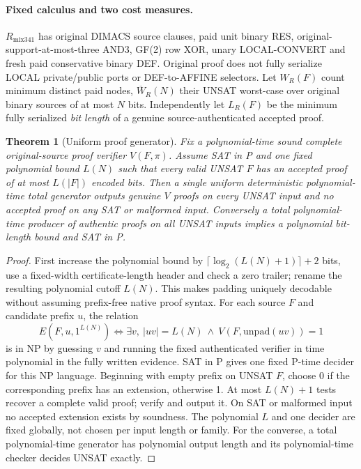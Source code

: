 \documentclass[11pt]{article}
\newtheorem{theorem}{Theorem}
\begin{document}
\paragraph{Fixed calculus and two cost measures.} $R_{\mathrm{mix341}}$ has original DIMACS source clauses, paid unit binary RES, original-support-at-most-three AND3, GF(2) row XOR, unary LOCAL-CONVERT and fresh paid conservative binary DEF. Original proof does not fully serialize LOCAL private/public ports or DEF-to-AFFINE selectors. Let $W_R(F)$ count minimum distinct paid nodes, $\overline W_R(N)$ their UNSAT worst-case over original binary sources of at most $N$ bits. Independently let $L_R(F)$ be the minimum fully serialized \emph{bit length} of a genuine source-authenticated accepted proof.
\begin{theorem}[Uniform proof generator]\label{t1}
Fix a polynomial-time sound complete original-source proof verifier $V(F,\pi)$. Assume SAT in P and one fixed polynomial bound $L(N)$ such that every valid UNSAT $F$ has an accepted proof of at most $L(|F|)$ encoded bits. Then a single uniform deterministic polynomial-time total generator outputs genuine $V$ proofs on every UNSAT input and no accepted proof on any SAT or malformed input. Conversely a total polynomial-time producer of authentic proofs on all UNSAT inputs implies a polynomial bit-length bound and SAT in P.
\end{theorem}
\begin{proof}
First increase the polynomial bound by $\lceil\log_2(L(N)+1)\rceil+2$ bits, use a fixed-width certificate-length header and check a zero trailer; rename the resulting polynomial cutoff $L(N)$. This makes padding uniquely decodable without assuming prefix-free native proof syntax. For each source $F$ and candidate prefix $u$, the relation
\[
E(F,u,1^{L(N)})\iff\exists v,\ |uv|=L(N)
\ \land\ V(F,\mathrm{unpad}(uv))=1
\]
is in NP by guessing $v$ and running the fixed authenticated verifier in time polynomial in the fully written evidence. SAT in P gives one fixed P-time decider for this NP language. Beginning with empty prefix on UNSAT $F$, choose 0 if the corresponding prefix has an extension, otherwise 1. At most $L(N)+1$ tests recover a complete valid proof; verify and output it. On SAT or malformed input no accepted extension exists by soundness. The polynomial $L$ and one decider are fixed globally, not chosen per input length or family. For the converse, a total polynomial-time generator has polynomial output length and its polynomial-time checker decides UNSAT exactly.
\end{proof}
\end{document}
